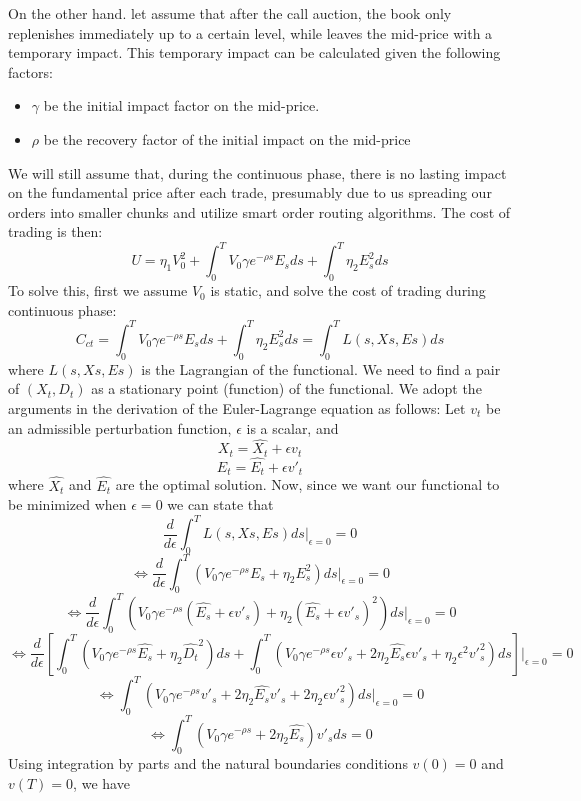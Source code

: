 \documentclass{article}
\begin{document}
On the other hand. let assume that after the call auction, the book only replenishes immediately up to a certain level, while leaves the mid-price with a temporary impact. This temporary impact can be calculated given the following factors:
\begin{itemize}
  \item $\gamma$ be the initial impact factor on the mid-price.
  \item $\rho$ be the recovery factor of the initial impact on the mid-price
\end{itemize}
We will still assume that, during the continuous phase, there is no lasting impact on the fundamental price after each trade, presumably due to us spreading our orders into smaller chunks and utilize smart order routing algorithms. The cost of trading is then:
\[
  U = \eta_1 V_0^2  + \int_0^T V_0 \gamma e^{-\rho s} E_s ds + \int_0^T \eta_2 E_s^2 ds
\]
To solve this, first we assume $V_0$ is static, and solve the cost of trading during continuous phase:
\[
  C_{ct} = \int_0^T V_0 \gamma e^{-\rho s} E_s ds + \int_0^T \eta_2 E_s^2 ds = \int_0^T L(s, Xs, Es) ds
\]
where $ L(s, Xs, Es)$ is the Lagrangian of the functional. We need to find a pair of $(X_t, D_t)$ as a stationary point (function) of the functional. We adopt the arguments in the derivation of the Euler-Lagrange equation as follows:
Let $v_t$ be an admissible perturbation function, $\epsilon$ is a scalar, and
\[
  X_t = \hat{X_t} + \epsilon v_t
\]
\[
  E_t = \hat{E_t} + \epsilon {v'}_t
\]
where $\hat{X_t}$ and $\hat{E_t}$ are the optimal solution. Now, since we want our functional to be minimized when $\epsilon=0$ we can state that
\[
  \frac{d}{d\epsilon} \int_0^T L(s, Xs, Es) ds|_{\epsilon=0}=0
\]
\[
  \Leftrightarrow \frac{d}{d\epsilon} \int_0^T (V_0 \gamma e^{-\rho s} E_s + \eta_2 E_s^2) ds|_{\epsilon=0}=0
\]
\[
  \Leftrightarrow \frac{d}{d\epsilon} \int_0^T (V_0 \gamma e^{-\rho s} (\hat{E_s} + \epsilon {v'}_s) + \eta_2 (\hat{E_s} + \epsilon {v'}_s)^2) ds|_{\epsilon=0}=0
\]
\[
  \Leftrightarrow \frac{d}{d\epsilon} \left[\int_0^T (V_0 \gamma e^{-\rho s} \hat{E_s} + \eta_2 \hat{D_t}^2 ) ds  + \int_0^T (V_0 \gamma e^{-\rho s}\epsilon {v'}_s + 2\eta_2\hat{E_s}\epsilon{v'}_s + \eta_2\epsilon^2{v'}^2_s)ds\right]|_{\epsilon=0}=0
\]
\[
  \Leftrightarrow \int_0^T (V_0 \gamma e^{-\rho s} {v'}_s + 2\eta_2\hat{E_s}{v'}_s + 2\eta_2\epsilon{v'}^2_s)ds|_{\epsilon=0} = 0
\]
\[
  \Leftrightarrow \int_0^T (V_0 \gamma e^{-\rho s}  + 2\eta_2\hat{E_s}) {v'}_s ds = 0
\]
Using integration by parts and the natural boundaries conditions $v(0)=0$ and $v(T)=0$, we have
\end{document}
